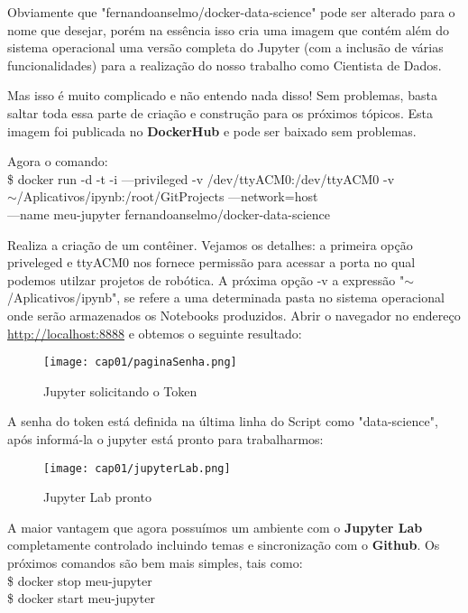 Obviamente que "fernandoanselmo/docker-data-science" pode ser alterado para o nome que desejar, porém na essência isso cria uma imagem que contém além do sistema operacional uma versão completa do Jupyter (com a inclusão de várias funcionalidades) para a realização do nosso trabalho como Cientista de Dados. 

\begin{note}[Socorro]{}
	Mas isso é muito complicado e não entendo nada disso! Sem problemas, basta saltar toda essa parte de criação e construção para os próximos tópicos. Esta imagem foi publicada no \textbf{DockerHub} e pode ser baixado sem problemas.
\end{note}

Agora o comando: \\
{\ttfamily\$ docker run -d -t -i ---privileged -v /dev/ttyACM0:/dev/ttyACM0 -v \\ $\sim$/Aplicativos/ipynb:/root/GitProjects ---network=host \\
	 ---name meu-jupyter fernandoanselmo/docker-data-science}
 
Realiza a criação de um contêiner. Vejamos os detalhes: a primeira opção priveleged e ttyACM0 nos fornece permissão para acessar a porta no qual podemos utilzar projetos de robótica. A próxima opção -v a expressão "$\sim$/Aplicativos/ipynb", se refere a uma determinada pasta no sistema operacional onde serão armazenados os Notebooks produzidos. Abrir o navegador no endereço \url{http://localhost:8888} e obtemos o seguinte resultado:
\begin{figure}[H]
	\centering\texttt{[image: cap01/paginaSenha.png]}
	\caption{Jupyter solicitando o Token}
\end{figure}

A senha do token está definida na última linha do Script como "data-science", após informá-la o jupyter está pronto para trabalharmos:
\begin{figure}[H]
	\centering\texttt{[image: cap01/jupyterLab.png]}
	\caption{Jupyter Lab pronto}
\end{figure}

A maior vantagem que agora possuímos um ambiente com o \textbf{Jupyter Lab} completamente controlado incluindo temas e sincronização com o \textbf{Github}. Os próximos comandos são bem mais simples, tais como: \\
{\ttfamily\$ docker stop meu-jupyter} \\
{\ttfamily\$ docker start meu-jupyter}

